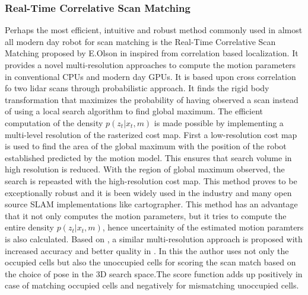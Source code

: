 \subsubsection{Real-Time Correlative Scan Matching}
    Perhaps the most efficient, intuitive and robust method commonly used in almost all modern day robot for scan matching is the Real-Time Correlative Scan Matching proposed by E.Olson in \cite{E.B.Olson} inspired from \cite{Konolige} 
correlation based localization. It provides a novel multi-resolution approaches to compute the motion parameters in conventional CPUs and modern day GPUs. It is based upon cross correlation fo two lidar scans through 
probabilistic approach. It finds the rigid body transformation that maximizes the probability of having observed a scan instead of using a local search algorithm to find global maximum. The efficient computation of the density
$p(z_t | x_t, m)$ is made possible by implementing a multi-level resolution of the rasterized cost map. First a low-resolution cost map is used to find the area of the global maximum with the position of the robot
established predicted by the motion model. This ensures that search volume in high resolution is reduced. With the region of global maximum observed, the search is repeasted with the high-resolution 
cost map. This method proves to be exceptionally robust and it is been widely used in the industry and many open source SLAM implementations like cartographer. 
    This method has an advantage that it not only computes the motion parameters, but it tries to compute the entire density $p(z_t | x_t, m)$, hence uncertainity of the estimated motion paramters is also calculated.
    Based on \cite{E.Olson}, a similar multi-resolution approach is proposed with increased accuracy and better quality in \cite{P.Vath}. In this the author uses not only the occupied cells but also the unoccupied cells for scoring the 
scan match based on the choice of pose in the 3D search space.The score function adds up positively in case of matching occupied cells and negatively for mismatching unoccupied cells.

